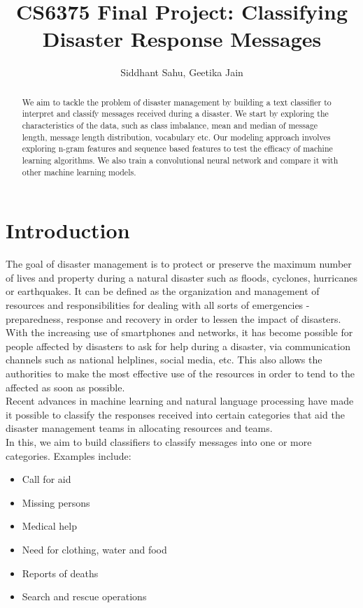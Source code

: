 \documentclass{article}
\title{CS6375 Final Project: Classifying Disaster Response Messages}
\author{Siddhant Sahu, Geetika Jain}
\begin{document}
\maketitle

\begin{abstract}
We aim to tackle the problem of disaster management by building a text classifier to interpret and classify messages received during a disaster. We start by exploring the characteristics of the data, such as class imbalance, mean and median of message length, message length distribution, vocabulary etc. Our modeling approach involves exploring n-gram features and sequence based features to test the efficacy of machine learning algorithms. We also train a convolutional neural network and compare it with other machine learning models.
\end{abstract}

\section{Introduction}
The goal of disaster management is to protect or preserve the maximum number of lives and property during a natural disaster such as floods, cyclones, hurricanes or earthquakes. It can be defined as the organization and management of resources and responsibilities for dealing with all sorts of emergencies - preparedness, response and recovery in order to lessen the impact of disasters.
\\

With the increasing use of smartphones and networks, it has become possible for people affected by disasters to ask for help during a disaster, via communication channels such as national helplines, social media, etc. This also allows the authorities to make the most effective use of the resources in order to tend to the affected as soon as possible.
\\

Recent advances in machine learning and natural language processing have made it possible to classify the responses received into certain categories that aid the disaster management teams in allocating resources and teams.
\\

In this, we aim to build classifiers to classify messages into one or more categories. Examples include:

\begin{itemize}
	\item Call for aid
	\item Missing persons
	\item Medical help
	\item Need for clothing, water and food
	\item Reports of deaths
	\item Search and rescue operations
\end{itemize}
\end{document}
